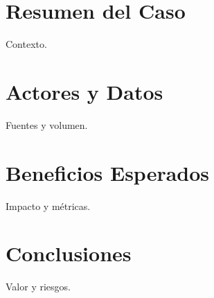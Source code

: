 
\graphicspath{{./}}

\section{Resumen del Caso} Contexto.
\section{Actores y Datos} Fuentes y volumen.
\section{Beneficios Esperados} Impacto y métricas.
\section{Conclusiones} Valor y riesgos.


